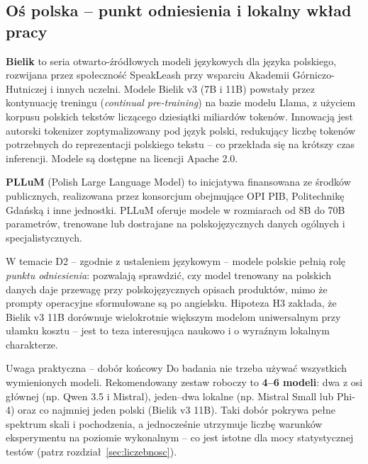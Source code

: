 \documentclass[12pt,a4paper]{article}
\begin{document}
\subsection*{Oś polska -- punkt odniesienia i lokalny wkład pracy}

\textbf{Bielik} to seria otwarto-źródłowych modeli językowych dla języka polskiego, rozwijana przez społeczność SpeakLeash przy wsparciu Akademii Górniczo-Hutniczej i innych uczelni. Modele Bielik v3 (7B i 11B) powstały przez kontynuację treningu (\emph{continual pre-training}) na bazie modelu Llama, z użyciem korpusu polskich tekstów liczącego dziesiątki miliardów tokenów. Innowacją jest autorski tokenizer zoptymalizowany pod język polski, redukujący liczbę tokenów potrzebnych do reprezentacji polskiego tekstu -- co przekłada się na krótszy czas inferencji. Modele są dostępne na licencji Apache 2.0.

\textbf{PLLuM} (Polish Large Language Model) to inicjatywa finansowana ze środków publicznych, realizowana przez konsorcjum obejmujące OPI PIB, Politechnikę Gdańską i inne jednostki. PLLuM oferuje modele w rozmiarach od 8B do 70B parametrów, trenowane lub dostrajane na polskojęzycznych danych ogólnych i specjalistycznych.

W temacie D2 -- zgodnie z ustaleniem językowym -- modele polskie pełnią rolę \emph{punktu odniesienia}: pozwalają sprawdzić, czy model trenowany na polskich danych daje przewagę przy polskojęzycznych opisach produktów, mimo że prompty operacyjne sformułowane są po angielsku. Hipoteza H3 zakłada, że Bielik v3 11B dorównuje wielokrotnie większym modelom uniwersalnym przy ułamku kosztu -- jest to teza interesująca naukowo i o wyraźnym lokalnym charakterze.

\begin{infobox}{Uwaga praktyczna -- dobór końcowy}
Do badania nie trzeba używać wszystkich wymienionych modeli. Rekomendowany zestaw roboczy to \textbf{4--6 modeli}: dwa z osi głównej (np. Qwen 3.5 i Mistral), jeden--dwa lokalne (np. Mistral Small lub Phi-4) oraz co najmniej jeden polski (Bielik v3 11B). Taki dobór pokrywa pełne spektrum skali i pochodzenia, a jednocześnie utrzymuje liczbę warunków eksperymentu na poziomie wykonalnym -- co jest istotne dla mocy statystycznej testów (patrz rozdział~\ref{sec:liczebnosc}).
\end{infobox}

\newpage

\end{document}
